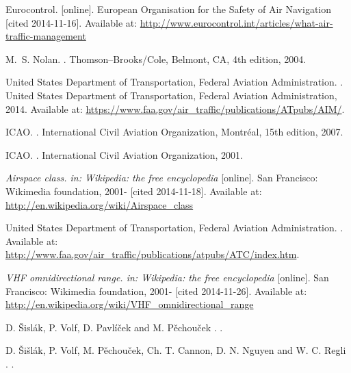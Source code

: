 \begin{thebibliography}{1}

Eurocontrol.
 [online].
\newblock European Organisation for the Safety of Air Navigation [cited 2014-11-16].
\newblock Available at: \url{http://www.eurocontrol.int/articles/what-air-traffic-management}

M.~S. Nolan.
.
\newblock Thomson--Brooks/Cole, Belmont, CA, 4th edition, 2004.

United States Department of Transportation, Federal Aviation Administration.
.
\newblock United States Department of Transportation, Federal Aviation Administration, 2014.
\newblock Available at: \url{https://www.faa.gov/air_traffic/publications/ATpubs/AIM/}.

ICAO.
.
\newblock International Civil Aviation Organization, Montréal, 15th edition, 2007.

ICAO.
.
\newblock International Civil Aviation Organization, 2001.

{\em Airspace class. in: Wikipedia: the free encyclopedia} [online].
\newblock San Francisco: Wikimedia foundation, 2001- [cited 2014-11-18].
\newblock Available at: \url{http://en.wikipedia.org/wiki/Airspace_class}

United States Department of Transportation, Federal Aviation Administration.
.
\newblock Available at: \url{http://www.faa.gov/air_traffic/publications/atpubs/ATC/index.htm}.

{\em VHF omnidirectional range. in: Wikipedia: the free encyclopedia} [online].
\newblock San Francisco: Wikimedia foundation, 2001- [cited 2014-11-26].
\newblock Available at: \url{http://en.wikipedia.org/wiki/VHF_omnidirectional_range}

D. Šislák, P. Volf, D. Pavlíček and M. Pěchouček
.
.

D. Šišlák, P. Volf, M. Pěchouček, Ch. T. Cannon, D. N. Nguyen and W. C. Regli
.
.



\end{thebibliography}
